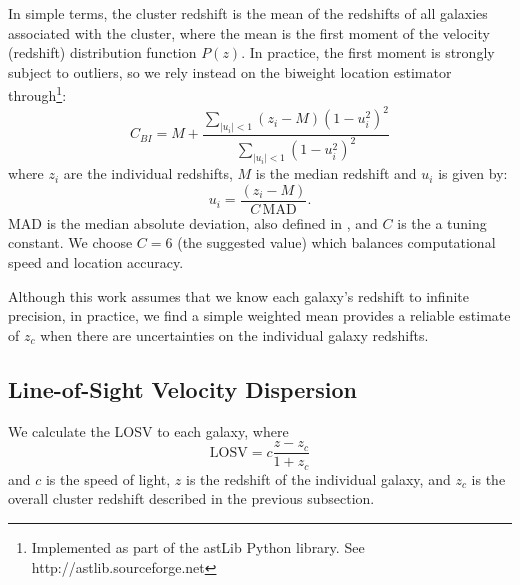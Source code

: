 In simple terms, the cluster redshift is the mean of the redshifts of all galaxies associated with the cluster, where the mean is the first moment of the velocity (redshift) distribution function $P(z)$. In practice, the first moment is strongly subject to outliers, so we rely instead on the biweight location estimator \citep{Beers1990} through\footnote{Implemented as part of the {\sc astLib} Python library. See \hbox{http://astlib.sourceforge.net}}:
\begin{equation}
C_{BI} = M + \frac{\sum_{|u_i| < 1} (z_i - M)(1-u_i^2)^2}{\sum_{|u_i| < 1}(1-u_i^2)^2}
\end{equation}
where $z_i$ are the individual redshifts, $M$ is the median redshift and $u_i$ is given by:
\begin{equation}
	u_i = \frac{(z_i - M)}{C\,\mathrm{MAD}}.
\end{equation}
MAD is the median absolute deviation, also defined in \cite{Beers1990}, and $C$ is the a tuning constant. We choose $C=6$ (the suggested value) which balances computational speed and location accuracy. 

Although this work assumes that we know each galaxy's redshift to infinite precision, in practice, we find a simple weighted mean provides a reliable estimate of $z_c$ when there are uncertainties on the individual galaxy redshifts. 

\subsection{Line-of-Sight Velocity Dispersion}\label{sec: LOSVD}
We calculate the LOSV to each galaxy, where
\begin{equation}
	\mathrm{LOSV} = c\frac{z - z_c}{1+z_c}
\end{equation}
and $c$ is the speed of light, $z$ is the redshift of the individual galaxy, and $z_c$ is the overall cluster redshift described in the previous subsection.

